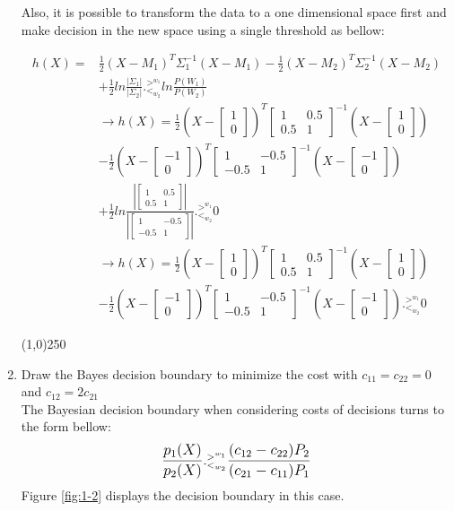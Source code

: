 \documentclass[12pt]{article}
\newcommand{\gl}{^{>^{w_1}}_{<_{w_2}}}
\newcommand{\svector}[2]{\left[ \begin{matrix} #1 \\ #2 \end{matrix}\right]}
\newcommand{\smatrix}[4]{\left[ \begin{matrix} #1 & #2 \\ #3 & #4 \end{matrix}\right]}
\begin{document}
\begin{enumerate}
Also, it is possible to transform the data to a one dimensional space first and make decision in the new space using a single threshold as bellow:

\begin{align*}
h(X) = &\frac{1}{2}(X-M_1)^T\Sigma_1^{-1}(X-M_1) - \frac{1}{2}(X-M_2)^T\Sigma_2^{-1}(X-M_2) \\
& + \frac{1}{2}ln\frac{|\Sigma_1|}{|\Sigma_2|} .\gl ln \frac{P(W_1)}{P(W_2)} \\
&\rightarrow h(X) = \frac{1}{2}(X-\svector{1}{0})^T\smatrix{1}{0.5}{0.5}{1}^{-1}(X-\svector{1}{0}) \\
&- \frac{1}{2}(X-\svector{-1}{0})^T\smatrix{1}{-0.5}{-0.5}{1}^{-1}(X-\svector{-1}{0}) \\
&+ \frac{1}{2}ln\frac{|\smatrix{1}{0.5}{0.5}{1}|}{|\smatrix{1}{-0.5}{-0.5}{1}|} .\gl 0 \\
&\rightarrow h(X) = \frac{1}{2}(X-\svector{1}{0})^T\smatrix{1}{0.5}{0.5}{1}^{-1}(X-\svector{1}{0}) \\
&- \frac{1}{2}(X-\svector{-1}{0})^T\smatrix{1}{-0.5}{-0.5}{1}^{-1}(X-\svector{-1}{0}) .\gl 0
\end{align*}

\begin{center}
\line(1,0){250}
\end{center}

\item Draw the Bayes decision boundary to minimize the cost with $c_{11} = c_{22} = 0$ and
$c_{12} = 2c_{21}$ \\
The Bayesian decision boundary when considering costs of decisions turns to the form bellow:
\begin{equation}
\mathlarger{\frac{p_1(X)}{p_2(X)}} .^{>^{w_1}}_{<_{w_2}} \mathlarger{\frac{(c_{12} - c_{22})P_2}{(c_{21} - c_{11})P_1}}
\label{eq:1-1}
\end{equation}
Figure \ref{fig:1-2} displays the decision boundary in this case.



\end{enumerate}
\end{document}
